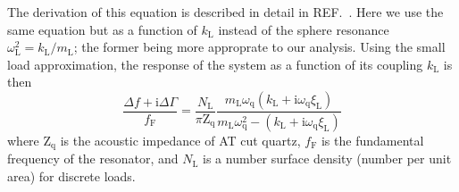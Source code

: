 \documentclass[floatfix,superscriptaddress,a4paper,notitlepage]{revtex4-1}
\newcommand{\Ref}[1]{REF.~\cite{#1}}
\newcommand{\mi}{{\mathrm{i}}}
\newcommand{\xil}{\xi_\mathrm{L}}
\newcommand{\kl}{k_\mathrm{L}}
\newcommand{\ml}{m_\mathrm{L}}
\begin{document}
The derivation of this equation is described in detail in
\Ref{olsson2012probing}.  Here we use the same equation but as a function
of $\kl$ instead of the sphere resonance $\omega_\mathrm{L}^2=\kl/\ml$; the
former being more approprate to our analysis.
Using the small load approximation, the response
of the system as a function of its coupling $\kl$ is then
\begin{equation}
\frac{\Delta\!f + \mi \Delta \Gamma}{f_\mathrm{F}} = \frac{N_\mathrm{L}}{\pi
\mathrm{Z}_\mathrm{q}}
\frac{\ml \omega_\mathrm{q} \left( \kl + \mi
\omega_\mathrm{q} \xil\right) }
{\ml \omega_\mathrm{q}^2 - \left(\kl + \mi
\omega_\mathrm{q} \xil\right)}
\label{eqn:mastereq}
\end{equation}
where $\mathrm{Z}_\mathrm{q}$ is the acoustic impedance of AT cut quartz,
$f_\mathrm{F}$ is the fundamental frequency of the resonator, and
$N_\mathrm{L}$ is a number surface density (number per unit area) for discrete
loads.



\end{document}
